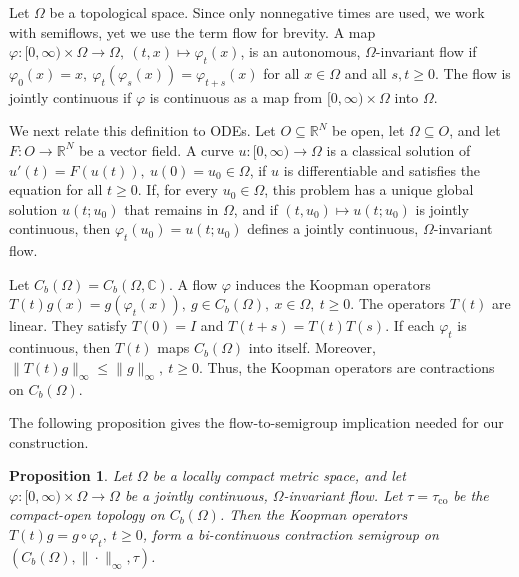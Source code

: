 \documentclass[preprint,1p,times,nopreprintline]{elsarticle}
\newtheorem{proposition}[theorem]{Proposition}
\begin{document}
Let $\Omega$ be a topological space. Since only nonnegative times are used, we work with semiflows, yet we use the term flow for brevity. A map $\varphi:[0,\infty)\times\Omega\to\Omega,~(t,x)\mapsto \varphi_t(x)$, is an autonomous, $\Omega$-invariant flow if $\varphi_0(x)=x,~\varphi_t(\varphi_s(x))=\varphi_{t+s}(x)$ for all $x\in\Omega$ and all $s,t\ge 0$. The flow is jointly continuous if $\varphi$ is continuous as a map from $[0,\infty)\times\Omega$ into $\Omega$.

We next relate this definition to ODEs. Let $O\subseteq\mathbb{R}^N$ be open, let $\Omega\subseteq O$, and let $F:O\to\mathbb{R}^N$ be a vector field. A curve $u:[0,\infty)\to\Omega$ is a classical solution of $u'(t)=F(u(t)),~u(0)=u_0\in\Omega$, if $u$ is differentiable and satisfies the equation for all $t\ge 0$. If, for every $u_0\in\Omega$, this problem has a unique global solution $u(t;u_0)$ that remains in $\Omega$, and if $(t,u_0)\mapsto u(t;u_0)$ is jointly continuous, then $\varphi_t(u_0)=u(t;u_0)$ defines a jointly continuous, $\Omega$-invariant flow.

Let $C_b(\Omega)=C_b(\Omega,\mathbb{C})$. A flow $\varphi$ induces the Koopman operators $T(t)g(x)=g(\varphi_t(x)),~g\in C_b(\Omega),~x\in\Omega,~t\ge 0$. The operators $T(t)$ are linear. They satisfy $T(0)=I$ and $T(t+s)=T(t)T(s)$. If each $\varphi_t$ is continuous, then $T(t)$ maps $C_b(\Omega)$ into itself. Moreover, $\|T(t)g\|_\infty\le \|g\|_\infty,~t\ge 0$. Thus, the Koopman operators are contractions on $C_b(\Omega)$.

The following proposition gives the flow-to-semigroup implication needed for our construction.

\begin{proposition}
\label{D-N}
Let $\Omega$ be a locally compact metric space, and let $\varphi:[0,\infty)\times\Omega\to\Omega$ be a jointly continuous, $\Omega$-invariant flow. Let $\tau=\tau_{\mathrm{co}}$ be the compact-open topology on $C_b(\Omega)$. Then the Koopman operators $T(t)g=g\circ\varphi_t,~t\ge 0$, form a bi-continuous contraction semigroup on $(C_b(\Omega),\|\cdot\|_\infty,\tau)$.
\end{proposition}
\end{document}
